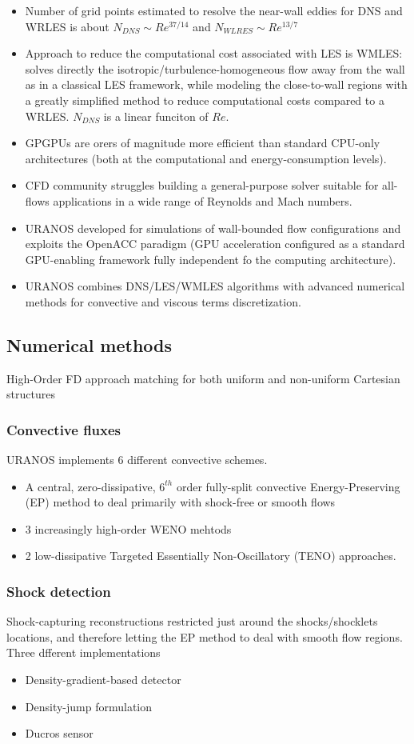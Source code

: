 \documentclass[10pt,a4paper]{article}
\begin{document}
\begin{itemize}
\item Number of grid points estimated to resolve the near-wall eddies for DNS and WRLES is about $N_{DNS} \sim Re^{37/14}$ and $N_{WLRES} \sim Re^{13/7}$
\item Approach to reduce the computational cost associated with LES is WMLES: solves directly the isotropic/turbulence-homogeneous flow away from the wall as in a classical LES framework, while modeling the close-to-wall regions with a greatly simplified method to reduce computational costs compared to a WRLES. $N_{DNS}$ is a linear funciton of $Re$.
\item GPGPUs are orers of magnitude more efficient than standard CPU-only architectures (both at the computational and energy-consumption levels).
\item CFD community struggles building a general-purpose solver suitable for all-flows applications in a wide range of Reynolds and Mach numbers.
\item URANOS developed for simulations of wall-bounded flow configurations and exploits the OpenACC paradigm (GPU acceleration configured as a standard GPU-enabling framework fully independent fo the computing architecture).
\item URANOS combines DNS/LES/WMLES algorithms with advanced numerical methods for convective and viscous terms discretization.
\end{itemize} 
\subsection{Numerical methods}
High-Order FD approach matching for both uniform and non-uniform Cartesian structures


\subsubsection{Convective fluxes}
URANOS implements 6 different convective schemes.
\begin{itemize}
\item A central, zero-dissipative, $6^{th}$ order fully-split convective Energy-Preserving (EP) method to deal primarily with shock-free or smooth flows
\item 3 increasingly high-order WENO mehtods
\item 2 low-dissipative Targeted Essentially Non-Oscillatory (TENO) approaches.
\end{itemize}
\subsubsection{Shock detection}
Shock-capturing reconstructions restricted just around the shocks/shocklets locations, and therefore letting the EP method to deal with smooth flow regions. Three dfferent implementations\\
\begin{itemize}
\item Density-gradient-based detector
\item Density-jump formulation
\item Ducros sensor
\end{itemize}
\end{document}
